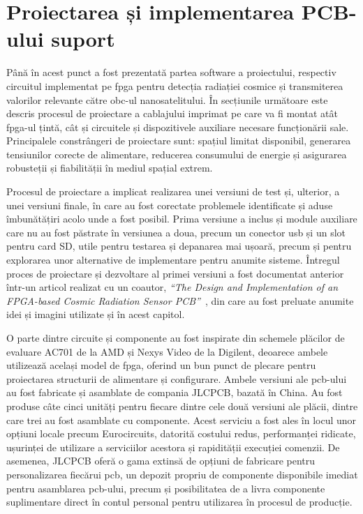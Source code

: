\documentclass[12pt,a4paper]{report}
\begin{document}

\chapter{Proiectarea și implementarea PCB-ului suport}
Până în acest punct a fost prezentată partea software a proiectului, respectiv circuitul implementat pe \gls{fpga} pentru detecția radiației cosmice și transmiterea valorilor relevante către \gls{obc}-ul nanosatelitului. În secțiunile următoare este descris procesul de proiectare a cablajului imprimat pe care va fi montat atât \gls{fpga}-ul țintă, cât și circuitele și dispozitivele auxiliare necesare funcționării sale. Principalele constrângeri de proiectare sunt: spațiul limitat disponibil, generarea tensiunilor corecte de alimentare, reducerea consumului de energie și asigurarea robusteții și fiabilității în mediul spațial extrem.

Procesul de proiectare a implicat realizarea unei versiuni de test și, ulterior, a unei versiuni finale, în care au fost corectate problemele identificate și aduse îmbunătățiri acolo unde a fost posibil. Prima versiune a inclus și module auxiliare care nu au fost păstrate în versiunea a doua, precum un conector \gls{usb} și un slot pentru card SD, utile pentru testarea și depanarea mai ușoară, precum și pentru explorarea unor alternative de implementare pentru anumite sisteme. Întregul proces de proiectare și dezvoltare al primei versiuni a fost documentat anterior într-un articol realizat cu un coautor, \emph{\enquote{The Design and Implementation of an FPGA-based Cosmic Radiation Sensor PCB}}~\cite{icemes}, din care au fost preluate anumite idei și imagini utilizate și în acest capitol.

O parte dintre circuite și componente au fost inspirate din schemele plăcilor de evaluare AC701 de la AMD și Nexys Video de la Digilent, deoarece ambele utilizează același model de \gls{fpga}, oferind un bun punct de plecare pentru proiectarea structurii de alimentare și configurare. Ambele versiuni ale \gls{pcb}-ului au fost fabricate și asamblate de compania JLCPCB, bazată în China. Au fost produse câte cinci unități pentru fiecare dintre cele două versiuni ale plăcii, dintre care trei au fost asamblate cu componente. Acest serviciu a fost ales în locul unor opțiuni locale precum Eurocircuits, datorită costului redus, performanței ridicate, ușurinței de utilizare a serviciilor acestora și rapidității execuției comenzii. De asemenea, JLCPCB oferă o gama extinsă de opțiuni de fabricare pentru personalizarea fiecărui \gls{pcb}, un depozit propriu de componente disponibile imediat pentru asamblarea \gls{pcb}-ului, precum și posibilitatea de a livra componente suplimentare direct în contul personal pentru utilizarea în procesul de producție.
\end{document}
